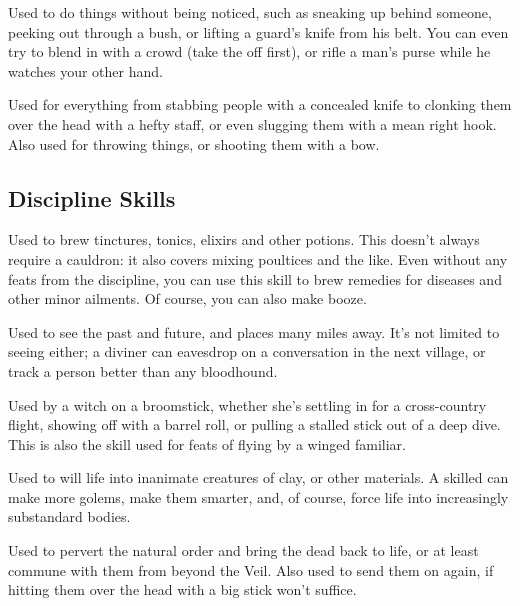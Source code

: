 Used to do things without being noticed, such as sneaking up behind someone, peeking out through a bush, or lifting a guard's knife from his belt.
You can even try to blend in with a crowd (take the {\hat} off first), or rifle a man's purse while he watches your other hand.


Used for everything from stabbing people with a concealed knife to clonking them over the head with a hefty staff, or even slugging them with a mean right hook.
Also used for throwing things, or shooting them with a bow.

\subsection{Discipline Skills}


Used to brew tinctures, tonics, elixirs and other potions.
This doesn't always require a cauldron: it also covers mixing poultices and the like.
Even without any feats from the discipline, you can use this skill to brew remedies for diseases and other minor ailments.
Of course, you can also make booze.


Used to see the past and future, and places many miles away.
It's not limited to seeing either; a diviner can eavesdrop on a conversation in the next village, or track a person better than any bloodhound.


Used by a witch on a broomstick, whether she's settling in for a cross-country flight, showing off with a barrel roll, or pulling a stalled stick out of a deep dive.
This is also the skill used for feats of flying by a winged familiar.


Used to will life into inanimate creatures of clay, or other materials.
A skilled  can make more golems, make them smarter, and, of course, force life into increasingly substandard bodies.


Used to pervert the natural order and bring the dead back to life, or at least commune with them from beyond the Veil.
Also used to send them on again, if hitting them over the head with a big stick won't suffice.


